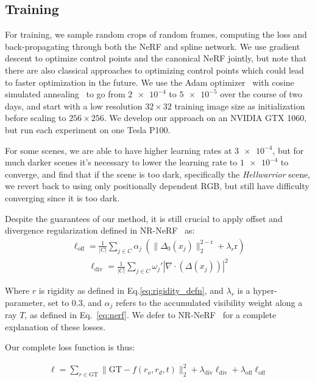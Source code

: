 \subsection*{Training}

For training, we sample random crops of random frames, computing the loss and back-propagating through both the NeRF and spline network. We use gradient descent to optimize control points and the canonical NeRF jointly, but note that there are also classical approaches to optimizing control points which could lead to faster optimization in the future. We use the Adam optimizer~\cite{Kingma2015AdamAM} with cosine simulated annealing~\cite{loshchilov2017sgdr} to go from $\num{2e-4}$ to $\num{5e-5}$ over the course of two days, and start with a low resolution $32\times32$ training image size as initialization before scaling to $256\times256$. We develop our approach on an NVIDIA GTX 1060, but run each experiment on one Tesla P100.

For some scenes, we are able to have higher learning rates at $\num{3e-4}$, but for much darker scenes it's necessary to lower the learning rate to $\num{1e-4}$ to converge, and find that if the scene is too dark, specifically the \textit{Hellwarrior} scene, we revert back to using only positionally dependent RGB, but still have difficulty converging since it is too dark.

Despite the guarantees of our method, it is still crucial to apply offset and divergence regularization defined in NR-NeRF~\cite{tretschk2021nonrigid} as:
\begin{align}
\ell_{\text{off}} = \frac{1}{|C|} \sum_{j\in C} \alpha_j \
    (\lVert \Delta_0(x_j) \rVert_2^{2-\text{r}}+\lambda_r \text{r})
\end{align}
\begin{align}
    \ell_{\text{div}} = \frac{1}{|C|} \sum_{j\in C} \omega_j' |\nabla\cdot(\Delta(x_j))|^2
\end{align}

Where $r$ is rigidity as defined in Eq.\ref{eq:rigidity_defn}, and $\lambda_r$ is a hyper-parameter, set to 0.3, and $\alpha_j$ refers to the accumulated visibility weight along a ray $T$, as defined in Eq.~\ref{eq:nerf}. We defer to NR-NeRF~\cite{tretschk2021nonrigid} for a complete explanation of these losses.

Our complete loss function is thus:

\begin{align}
    \ell = \sum\limits_{r\in\text{GT}}\lVert\text{GT} - f(r_o, r_d, t)\rVert_2^2 + \lambda_{\text{div}}\ell_\text{div} + \lambda_\text{off}\ell_\text{off}
\end{align}

